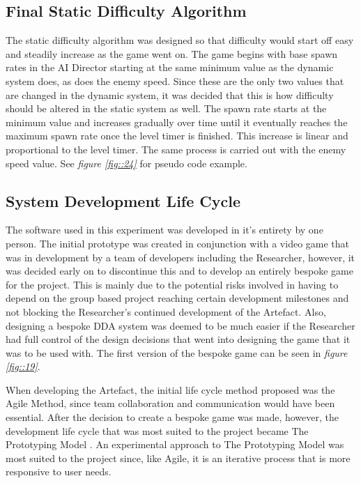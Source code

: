 \documentclass[journal]{IEEEtran}
\begin{document}
\subsection{Final Static Difficulty Algorithm}
The static difficulty algorithm was designed so that difficulty would start off easy and steadily increase as the game went on. The game begins with base spawn rates in the AI Director starting at the same minimum value as the dynamic system does, as does the enemy speed. Since these are the only two values that are changed in the dynamic system, it was decided that this is how difficulty should be altered in the static system as well. The spawn rate starts at the minimum value and increases gradually over time until it eventually reaches the maximum spawn rate once the level timer is finished. This increase is linear and proportional to the level timer. The same process is carried out with the enemy speed value. See \textit{figure \ref{fig::24}} for pseudo code example. 


\subsection{System Development Life Cycle}

The software used in this experiment was developed in it's entirety by one person. The initial prototype was created in conjunction with a video game that was in development by a team of developers including the Researcher, however, it was decided early on to discontinue this and to develop an entirely bespoke game for the project. This is mainly due to the potential risks involved in having to depend on the group based project reaching certain development milestones and not blocking the Researcher's continued development of the Artefact. Also, designing a bespoke DDA system was deemed to be much easier if the Researcher had full control of the design decisions that went into designing the game that it was to be used with. The first version of the bespoke game can be seen in \textit{figure \ref{fig::19}}.

When developing the Artefact, the initial life cycle method proposed was the Agile Method, since team collaboration and communication would have been essential. After the decision to create a bespoke game was made, however, the development life cycle that was most suited to the project became The Prototyping Model \cite{isaias2015information}. An experimental approach to The Prototyping Model was most suited to the project since, like Agile, it is an iterative process that is more responsive to user needs. 
\end{document}
